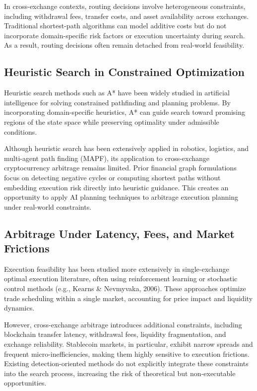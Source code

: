 In cross-exchange contexts, routing decisions involve heterogeneous constraints, including withdrawal fees, transfer costs, and asset availability across exchanges. Traditional shortest-path algorithms can model additive costs but do not incorporate domain-specific risk factors or execution uncertainty during search. As a result, routing decisions often remain detached from real-world feasibility.

\subsection{Heuristic Search in Constrained Optimization}

Heuristic search methods such as A* have been widely studied in artificial intelligence for solving constrained pathfinding and planning problems. By incorporating domain-specific heuristics, A* can guide search toward promising regions of the state space while preserving optimality under admissible conditions.

Although heuristic search has been extensively applied in robotics, logistics, and multi-agent path finding (MAPF), its application to cross-exchange cryptocurrency arbitrage remains limited. Prior financial graph formulations focus on detecting negative cycles or computing shortest paths without embedding execution risk directly into heuristic guidance. This creates an opportunity to apply AI planning techniques to arbitrage execution planning under real-world constraints.

\subsection{Arbitrage Under Latency, Fees, and Market Frictions}

Execution feasibility has been studied more extensively in single-exchange optimal execution literature, often using reinforcement learning or stochastic control methods (e.g., Kearns \& Nevmyvaka, 2006). These approaches optimize trade scheduling within a single market, accounting for price impact and liquidity dynamics.

However, cross-exchange arbitrage introduces additional constraints, including blockchain transfer latency, withdrawal fees, liquidity fragmentation, and exchange reliability. Stablecoin markets, in particular, exhibit narrow spreads and frequent micro-inefficiencies, making them highly sensitive to execution frictions. Existing detection-oriented methods do not explicitly integrate these constraints into the search process, increasing the risk of theoretical but non-executable opportunities.

